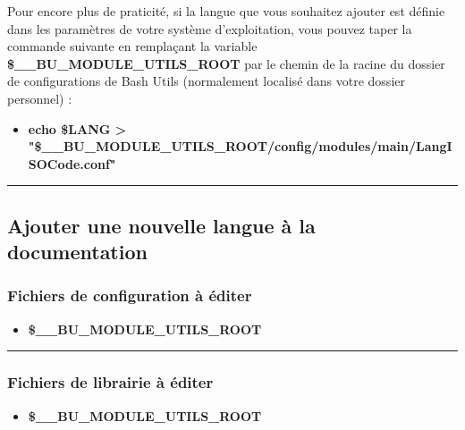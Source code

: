 \documentclass[a4paper,10pt]{article}
\begin{document}
\begin{justify}
    Pour encore plus de praticité, si la langue que vous souhaitez ajouter est définie dans les paramètres de votre système d'exploitation, vous pouvez taper la commande suivante en remplaçant la variable \textbf{\color{vars}\$\_\_BU\_MODULE\_UTILS\_ROOT} par le chemin de la racine du dossier de configurations de Bash Utils (normalement localisé dans votre dossier personnel) :

    \begin{itemize}
        \item \textbf{\color{cmds}echo \color{vars}\$LANG \color{text} > "\color{vars}\$\_\_BU\_MODULE\_UTILS\_ROOT\color{path}/config/modules/main/LangISOCode.conf\color{text}"}
    \end{itemize}
\end{justify}




\color{sec2}\par\noindent\rule{\textwidth}{0.4pt}\color{text}

\color{sec2}
\subsection{Ajouter une nouvelle langue à la documentation}\color{text}

\color{sec3}
\subsubsection{Fichiers de configuration à éditer}\color{text}

\begin{itemize}
    \item \textbf{\color{vars}\$\_\_BU\_MODULE\_UTILS\_ROOT\color{path}}
\end{itemize}


\color{sec3}\par\noindent\rule{\textwidth}{0.4pt}\color{text}

\color{sec3}
\subsubsection{Fichiers de librairie à éditer}\color{text}

\begin{itemize}
    \item \textbf{\color{vars}\$\_\_BU\_MODULE\_UTILS\_ROOT\color{path}}
\end{itemize}
\end{document}
